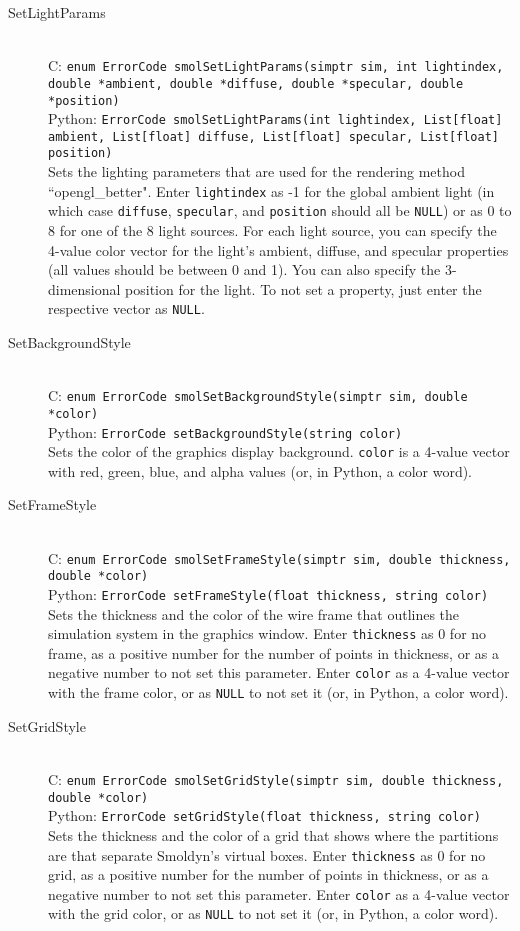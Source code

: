 \documentclass {book}
\newcommand {\ttt} {\texttt}
\begin{document}
\begin{description}
\item[SetLightParams]
\hfill \\
C: \ttt{enum ErrorCode smolSetLightParams(simptr sim, int lightindex, double *ambient, double *diffuse, double *specular, double *position)}\\
Python: \ttt{ErrorCode smolSetLightParams(int lightindex, List[float] ambient, List[float] diffuse, List[float] specular, List[float] position)}\\
Sets the lighting parameters that are used for the rendering method ``opengl\_better". Enter \ttt{lightindex} as -1 for the global ambient light (in which case \ttt{diffuse}, \ttt{specular}, and \ttt{position} should all be \ttt{NULL}) or as 0 to 8 for one of the 8 light sources. For each light source, you can specify the 4-value color vector for the light's ambient, diffuse, and specular properties (all values should be between 0 and 1). You can also specify the 3-dimensional position for the light. To not set a property, just enter the respective vector as \ttt{NULL}.

\item[SetBackgroundStyle]
\hfill \\
C: \ttt{enum ErrorCode smolSetBackgroundStyle(simptr sim, double *color)}\\
Python: \ttt{ErrorCode setBackgroundStyle(string color)}\\
Sets the color of the graphics display background. \ttt{color} is a 4-value vector with red, green, blue, and alpha values (or, in Python, a color word).

\item[SetFrameStyle]
\hfill \\
C: \ttt{enum ErrorCode smolSetFrameStyle(simptr sim, double thickness, double *color)}\\
Python: \ttt{ErrorCode setFrameStyle(float thickness, string color)}\\
Sets the thickness and the color of the wire frame that outlines the simulation system in the graphics window. Enter \ttt{thickness} as 0 for no frame, as a positive number for the number of points in thickness, or as a negative number to not set this parameter. Enter \ttt{color} as a 4-value vector with the frame color, or as \ttt{NULL} to not set it (or, in Python, a color word).

\item[SetGridStyle]
\hfill \\
C: \ttt{enum ErrorCode smolSetGridStyle(simptr sim, double thickness, double *color)}\\
Python: \ttt{ErrorCode setGridStyle(float thickness, string color)}\\
Sets the thickness and the color of a grid that shows where the partitions are that separate Smoldyn's virtual boxes. Enter \ttt{thickness} as 0 for no grid, as a positive number for the number of points in thickness, or as a negative number to not set this parameter. Enter \ttt{color} as a 4-value vector with the grid color, or as \ttt{NULL} to not set it (or, in Python, a color word).


\end{description}
\end{document}
